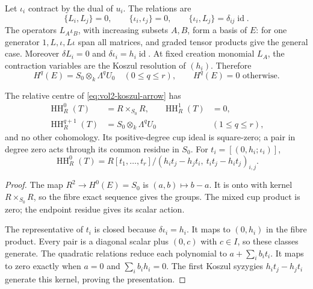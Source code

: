 Let $\iota_i$ contract by the dual of $u_i$. The relations are
\begin{equation}\label{eq:vol2-koszul-clifford}
 \{L_i,L_j\}=0,\qquad \{\iota_i,\iota_j\}=0,
 \qquad \{\iota_i,L_j\}=\delta_{ij}\operatorname{id}.
\end{equation}
The operators $L_A\iota_B$, with increasing subsets $A,B$,
form a basis of $E$: for one generator $1,L,\iota,L\iota$
span all matrices, and graded tensor products give the general
case. Moreover $\delta L_i=0$ and
$\delta\iota_i=h_i\operatorname{id}$. At fixed creation
monomial $L_A$, the contraction variables are the Koszul
resolution of $(h_i)$. Therefore
\[
 H^q(E)=S_0\otimes_k\Lambda^qU_0\quad(0\leq q\leq r),
 \qquad H^q(E)=0\text{ otherwise}.
\]

\begin{theorem}\label{thm:vol2-koszul-centre-ring}
The relative centre of \eqref{eq:vol2-koszul-arrow} has
\begin{align*}
 \operatorname{HH}_R^0(T)&=R\times_{S_0}R,&
 \operatorname{HH}_R^1(T)&=0,\\
 \operatorname{HH}_R^{q+1}(T)&=S_0\otimes_k\Lambda^qU_0
                         &&(1\leq q\leq r),
\end{align*}
and no other cohomology. Its positive-degree cup ideal is
square-zero; a pair in degree zero acts through its common
residue in $S_0$. For $t_i=[(0,h_i;\iota_i)]$,
\begin{equation}\label{eq:vol2-koszul-centre-presentation}
 \operatorname{HH}_R^0(T)
 =R[t_1,\ldots,t_r]/(h_it_j-h_jt_i,\ t_it_j-h_it_j)_{i,j}.
\end{equation}
\end{theorem}
\begin{proof}
The map $R^2\to H^0(E)=S_0$ is $(a,b)\mapsto b-a$.
It is onto with kernel $R\times_{S_0}R$, so the fibre exact
sequence gives the groups. The mixed cup product is zero;
the endpoint residue gives its scalar action.

The representative of $t_i$ is closed because
$\delta\iota_i=h_i$. It maps to $(0,h_i)$ in the fibre product.
Every pair is a diagonal scalar plus $(0,c)$ with $c\in I$,
so these classes generate. The quadratic relations reduce
each polynomial to $a+\sum_ib_it_i$. It maps to zero exactly
when $a=0$ and $\sum_ib_ih_i=0$. The first Koszul syzygies
$h_it_j-h_jt_i$ generate this kernel, proving the presentation.
\end{proof}

